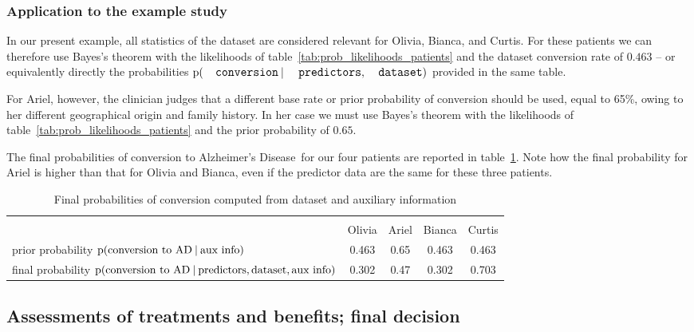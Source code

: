\documentclass[utf8]{FrontiersinHarvard} %
\newcommand*{\p}{\mathrm{p}}%
\renewcommand*{\|}[1][]{\nonscript\:#1\vert\nonscript\:\mathopen{}}
\newcommand*{\ad}{Alzheimer's Disease}
\begin{document}
\subsubsection{Application to the example study}
\label{sec:posterior_application}

In our present example, all statistics of the dataset are considered relevant for Olivia, Bianca, and Curtis. For these patients we can therefore use Bayes's theorem with the likelihoods of table~\ref{tab:prob_likelihoods_patients} and the dataset conversion rate of $0.463$ -- or equivalently directly the probabilities $\p(\texttt{\small conversion} \| \texttt{\small predictors}, \texttt{\small dataset})$ provided in the same table.

For Ariel, however, the clinician judges that a different base rate or prior probability of conversion should be used, equal to 65\%,  owing to her different geographical origin and family history. In her case we must use Bayes's theorem with the likelihoods of table~\ref{tab:prob_likelihoods_patients} and the prior probability of $0.65$.

The final probabilities of conversion to \ad\ for our four patients are reported in table~\ref{tab:posterior_patients}. Note how the final probability for Ariel is higher than that for Olivia and Bianca, even if the predictor data are the same for these three patients.

\medskip
\begin{table}[!h]
  \centering
  \begin{tabular}{lcccc}
    \hline\\[-1.5\jot]
    &{\small Olivia} &{\small Ariel} &{\small Bianca} &{\small Curtis}
    \\[\jot]
    {\small prior probability $\p(\text{conversion to AD} \| \text{aux info})$}&
    0.463&0.65&0.463&0.463
    \\
    {\small final probability $\p(\text{conversion to AD} \| \text{predictors}, \text{dataset}, \text{aux info})$}&
    0.302&0.47&0.302&0.703
    \\[\jot]
    \hline
  \end{tabular}
    \caption{Final probabilities of conversion computed from dataset and auxiliary information}\label{tab:posterior_patients}
\end{table}


\newpage%
\subsection{Assessments of treatments and benefits; final decision}
\label{sec:utilities_step}
\end{document}
